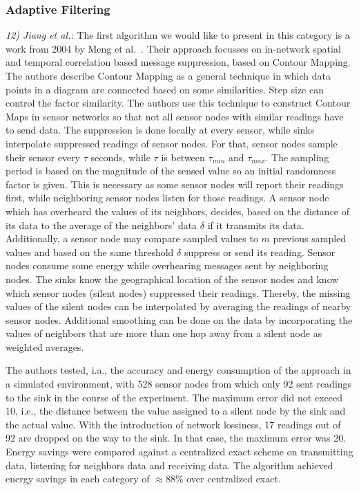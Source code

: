 \subsubsection{Adaptive Filtering}
\label{sec:Adaptive Filtering}

\textit{12) Jiang et al.:}
The first algorithm we would like to present in this category is a work from
2004 by Meng et al.~\cite{meng2004event}. Their approach focusses on in-network
spatial and temporal correlation based message suppression, based on Contour
Mapping. The authors describe Contour Mapping as a general technique in which
data points in a diagram are connected based on some similarities. Step size
can control the factor similarity. The authors use this technique to construct
Contour Maps in sensor networks so that not all sensor nodes with similar
readings have to send data. The suppression is done locally at every sensor,
while sinks interpolate suppressed readings of sensor nodes. For that, sensor
nodes sample their sensor every $ \tau $ seconds, while $ \tau $ is between $
\tau_{min} $ and $ \tau_{max} $. The sampling period is based on the magnitude
of the sensed value so an initial randomness factor is given. This is necessary
as some sensor nodes will report their readings first, while neighboring sensor
nodes listen for those readings. A sensor node which has overheard the values
of its neighbors, decides, based on the distance of its data to the average of
the neighbors' data $ \delta $ if it transmits its data. Additionally, a sensor
node may compare sampled values to $ m $ previous sampled values and based on
the same threshold $ \delta $ suppress or send its reading. Sensor nodes
consume some energy while overhearing messages sent by neighboring nodes. The
sinks know the geographical location of the sensor nodes and know which sensor
nodes (silent nodes) suppressed their readings. Thereby, the missing values of
the silent nodes can be interpolated by averaging the readings of nearby sensor
nodes. Additional smoothing can be done on the data by incorporating the values
of neighbors that are more than one hop away from a silent node as weighted
averages.

The authors tested, i.a., the accuracy and energy consumption of the approach
in a simulated environment, with 528 sensor nodes from which only 92 sent
readings to the sink in the course of the experiment. The maximum error did not
exceed 10, i.e., the distance between the value assigned to a silent node by
the sink and the actual value. With the introduction of network lossiness, 17
readings out of 92 are dropped on the way to the sink. In that case, the
maximum error was 20. Energy savings were compared against a centralized exact
scheme on transmitting data, listening for neighbors data and receiving data.
The algorithm achieved energy savings in each category of $ \approx88\% $ over
centralized exact.

